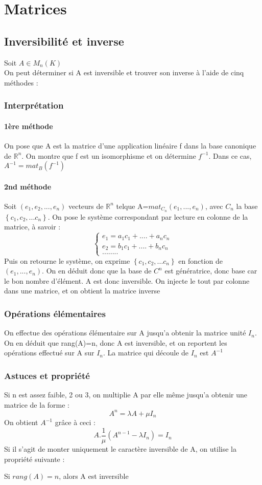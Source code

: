 \chapter{Matrices}
\section{Inversibilité et inverse}
Soit $A \in M_n(K)$ \\
On peut déterminer si A est inversible et trouver son inverse à l'aide de cinq méthodes :
\subsection{Interprétation}
\subsubsection{1ère méthode}
On pose que A est la matrice d'une application linéaire f dans la base canonique de $\mathbb{R}^n$. On montre que f est un isomorphisme et on détermine $f^{-1}$. Dans ce cas, $A^{-1}=mat_B(f^{-1})$
\subsubsection{2nd méthode}
Soit $(e_1,e_2,...,e_n)$ vecteurs de $\mathbb{R}^n$ telque A=$mat_{C_n}(e_1,...,e_n)$, avec $C_n$ la base $\left\{c_1,c_2,...c_n\right\}$. On pose le système correspondant par lecture en colonne de la matrice, à savoir :
  \[\left\{\begin{array}{c}
   e_1 = a_1c_1+....+a_nc_n\\
   e_2 = b_1c_1+....+b_nc_n\\
   ........
  \end{array}\right.
\]
Puis on retourne le système, on exprime $\left\{c_1,c_2,...c_n\right\}$ en fonction de $(e_1,...,e_n)$. On en déduit donc que la base de $C^n$ est génératrice, donc base car le bon nombre d'élément. A est donc inversible. On injecte le tout par colonne dans une matrice, et on obtient la matrice inverse
\subsection{Opérations élémentaires}
On effectue des opérations élémentaire sur A jusqu'a obtenir la matrice unité $I_n$. On en déduit que rang(A)=n, donc A est inversible, et on reportent les opérations effectué sur A sur $I_n$. La matrice qui découle de $I_n$ est $A^{-1}$
\subsection{Astuces et propriété}
Si n est assez faible, 2 ou 3, on multiplie A par elle même jusqu'a obtenir une matrice de la forme : 
$$A^{n}=\lambda A + \mu I_n $$
On obtient $A^{-1}$ grâce à ceci : $$A.\dfrac{1}{\mu}(A^{n-1}- \lambda I_n) = I_n$$
Si il s'agit de monter uniquement le caractère inversible de A, on utilise la propriété suivante :
\begin{prop}
Si $rang(A)=n$, alors A est inversible
\end{prop}
